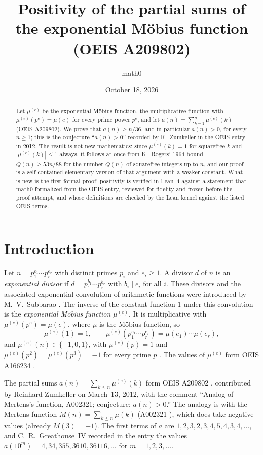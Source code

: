 \documentclass[11pt]{amsart}
\title[Positivity of the exponential Mertens function]{Positivity of the partial sums of the exponential M\"obius function (OEIS A209802)}
\author{math0}
\date{October 18, 2026}
\theoremstyle{plain}
\theoremstyle{definition}
\newcommand{\mue}{\mu^{(e)}}
\begin{document}
\begin{abstract}
Let $\mue$ be the exponential M\"obius function, the multiplicative function with $\mue(p^e)=\mu(e)$ for every prime power $p^e$, and let $a(n)=\sum_{k=1}^{n}\mue(k)$ (OEIS A209802).
We prove that $a(n)\ge n/36$, and in particular $a(n)>0$, for every $n\ge1$; this is the conjecture ``$a(n)>0$'' recorded by R.~Zumkeller in the OEIS entry in 2012.
The result is not new mathematics: since $\mue(k)=1$ for squarefree $k$ and $|\mue(k)|\le1$ always, it follows at once from K.~Rogers' 1964 bound $Q(n)\ge 53n/88$ for the number $Q(n)$ of squarefree integers up to $n$, and our proof is a self-contained elementary version of that argument with a weaker constant.
What is new is the first formal proof: positivity is verified in Lean~4 against a statement that math0 formalized from the OEIS entry, reviewed for fidelity and frozen before the proof attempt, and whose definitions are checked by the Lean kernel against the listed OEIS terms.
\end{abstract}
\maketitle

\section{Introduction}

Let $n=p_1^{e_1}\cdots p_r^{e_r}$ with distinct primes $p_i$ and $e_i\ge1$. A divisor $d$ of $n$ is an \emph{exponential divisor} if $d=p_1^{b_1}\cdots p_r^{b_r}$ with $b_i\mid e_i$ for all $i$. These divisors and the associated exponential convolution of arithmetic functions were introduced by M.~V.~Subbarao \cite{Sub}. The inverse of the constant function $1$ under this convolution is the \emph{exponential M\"obius function} $\mue$. It is multiplicative with $\mue(p^e)=\mu(e)$, where $\mu$ is the M\"obius function, so
\[
  \mue(1)=1,\qquad \mue(p_1^{e_1}\cdots p_r^{e_r})=\mu(e_1)\cdots\mu(e_r),
\]
and $\mue(n)\in\{-1,0,1\}$, with $\mue(p)=1$ and $\mue(p^2)=\mue(p^3)=-1$ for every prime $p$ \cite[\S2]{Toth}. The values of $\mue$ form OEIS A166234 \cite{A166234}.

The partial sums $a(n)=\sum_{k\le n}\mue(k)$ form OEIS A209802 \cite{A209802}, contributed by Reinhard Zumkeller on March~13, 2012, with the comment ``Analog of Mertens's function, A002321; conjecture: $a(n)>0$.'' The analogy is with the Mertens function $M(n)=\sum_{k\le n}\mu(k)$ (A002321 \cite{A002321}), which does take negative values (already $M(3)=-1$). The first terms of $a$ are $1,2,3,2,3,4,5,4,3,4,\dots$, and C.~R.~Greathouse~IV recorded in the entry the values $a(10^m)=4,34,355,3610,36116,\dots$ for $m=1,2,3,\dots$.
\end{document}

